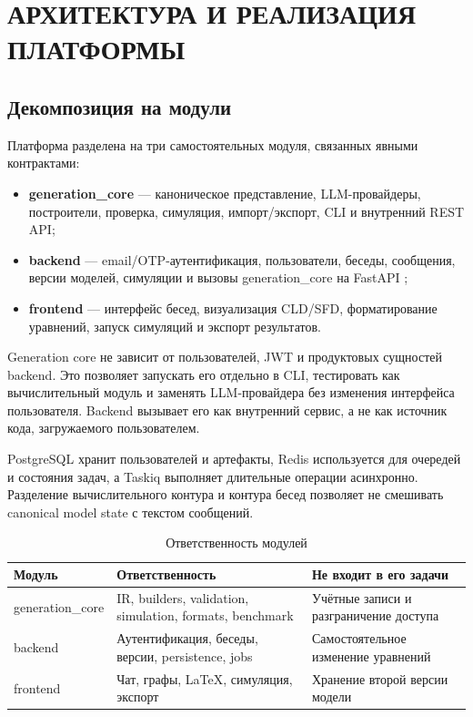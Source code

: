 \chapter{АРХИТЕКТУРА И РЕАЛИЗАЦИЯ ПЛАТФОРМЫ}

\section{Декомпозиция на модули}

Платформа разделена на три самостоятельных модуля, связанных явными контрактами:

\begin{itemize}
    \item \textbf{generation\_core} --- каноническое представление, LLM-провайдеры, построители, проверка, симуляция, импорт/экспорт, CLI и внутренний REST API;
    \item \textbf{backend} --- email/OTP-аутентификация, пользователи, беседы, сообщения, версии моделей, симуляции и вызовы generation\_core на FastAPI \cite{fastapi2024};
    \item \textbf{frontend} --- интерфейс бесед, визуализация CLD/SFD, форматирование уравнений, запуск симуляций и экспорт результатов.
\end{itemize}

Generation core не зависит от пользователей, JWT и продуктовых сущностей backend. Это позволяет запускать его отдельно в CLI, тестировать как вычислительный модуль и заменять LLM-провайдера без изменения интерфейса пользователя. Backend вызывает его как внутренний сервис, а не как источник кода, загружаемого пользователем.

PostgreSQL \cite{postgres2024} хранит пользователей и артефакты, Redis используется для очередей и состояния задач, а Taskiq \cite{taskiq2024} выполняет длительные операции асинхронно. Разделение вычислительного контура и контура бесед позволяет не смешивать canonical model state с текстом сообщений.

\begin{table}[H]
    \centering
    \caption{Ответственность модулей}
    \label{tab:module-responsibility}
    \small
    \begin{tabularx}{\textwidth}{L{3cm}L{6cm}X}
        \toprule
        Модуль & Ответственность & Не входит в его задачи \\
        \midrule
        generation\_core & IR, builders, validation, simulation, formats, benchmark & Учётные записи и разграничение доступа \\
        backend & Аутентификация, беседы, версии, persistence, jobs & Самостоятельное изменение уравнений \\
        frontend & Чат, графы, LaTeX, симуляция, экспорт & Хранение второй версии модели \\
        \bottomrule
    \end{tabularx}
\end{table}

